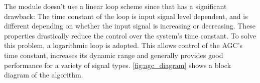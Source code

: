 The module doesn't use a linear loop scheme since that has a significant drawback: The time constant of the loop is input signal level dependent, and is different depending on whether the input signal is increasing or decreasing. These properties drastically reduce the control over the system's time constant. To solve this problem, a logarithmic loop is adopted. This allows control of the AGC's time constant, increases its dynamic range and generally provides good performance for a variety of signal types. \autoref{fig:agc_diagram} shows a block diagram of the algorithm.



